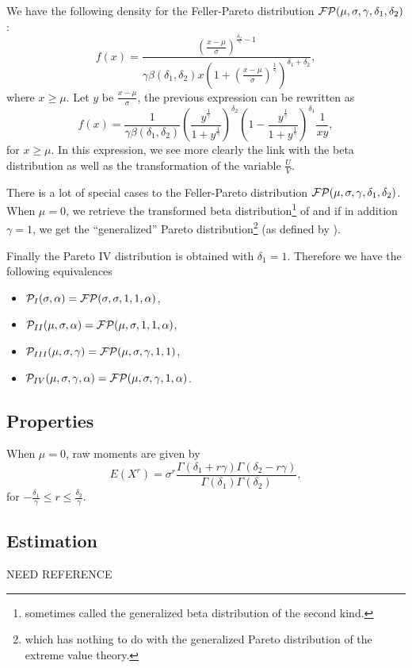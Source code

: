 We have the following density for the Feller-Pareto distribution $\mathcal F\mathcal P(\mu,\sigma,\gamma,\delta_1,\delta_2)$ :
$$
f(x) = \frac{(\frac{x-\mu}{\sigma})^{\frac{\delta_2}{\gamma}-1}}{\gamma \beta(\delta_1, \delta_2) x (1+(\frac{x-\mu}{\sigma})^{\frac{1}{\gamma}})^{\delta_1 + \delta_2}},
$$
where $x\geq\mu$. Let $y$ be $\frac{x-\mu}{\sigma}$, the previous expression can be rewritten as
$$
f(x) =  \frac{1 }{ \gamma \beta(\delta_1, \delta_2)   }
\left(\frac{ y^{\frac{1}{\gamma}} }{ 1+y^{\frac{1}{\gamma}} } \right)^{\delta_2}  
\left(1- \frac{ y^{\frac{1}{\gamma}} }{ 1+y^{\frac{1}{\gamma}} } \right)^{\delta_1}
 \frac{ 1 }{  x y },
$$
for $x\geq\mu$. In this expression, we see more clearly the link with the beta distribution as well as the transformation of the variable $\frac{U}{V}$.

There is a lot of special cases to the Feller-Pareto distribution $\mathcal F\mathcal P(\mu,\sigma,\gamma,\delta_1,\delta_2)$. When $\mu=0$, we retrieve the transformed beta distribution\footnote{sometimes called the generalized beta distribution of the second kind.} of \cite{klugman} and if in addition $\gamma=1$, we get the ``generalized'' Pareto distribution\footnote{which has nothing to do with the generalized Pareto distribution of the extreme value theory.} (as defined by \cite{klugman}).

Finally the Pareto IV distribution is obtained with $\delta_1=1$. Therefore we have the following equivalences
\begin{itemize}
\item $\mathcal P_I(\sigma,\alpha) =  \mathcal F\mathcal P(\sigma,\sigma,1,1,\alpha)$,
\item $\mathcal P_{II}(\mu,\sigma,\alpha) =  \mathcal F\mathcal P(\mu,\sigma,1,1,\alpha)$,
\item $\mathcal P_{III}(\mu,\sigma,\gamma) =  \mathcal F\mathcal P(\mu,\sigma,\gamma,1,1)$,
\item $\mathcal P_{IV}(\mu,\sigma,\gamma,\alpha) =  \mathcal F\mathcal P(\mu,\sigma,\gamma,1,\alpha)$.
\end{itemize}

\subsection{Properties}
When $\mu=0$, raw moments are given by
$$
E(X^r) = \sigma^r \frac{\Gamma(\delta_1+r\gamma)
\Gamma(\delta_2-r\gamma)}{\Gamma(\delta_1)\Gamma(\delta_2)},
$$
for $-\frac{\delta_1}{\gamma}\leq r\leq \frac{\delta_2}{\gamma}$.

\subsection{Estimation}
NEED REFERENCE
